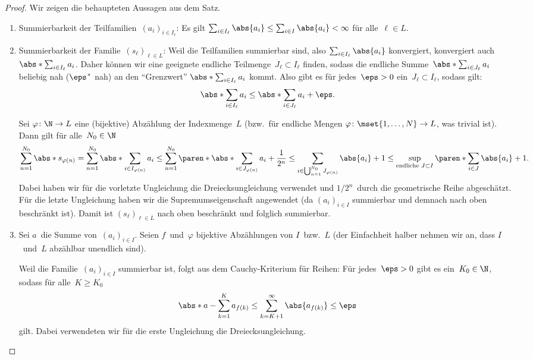 \documentclass[a4paper]{article}
\begin{document}
\begin{proof}
    Wir zeigen die behaupteten Aussagen aus dem Satz.
    \begin{enumerate}
        \item Summierbarkeit der Teilfamilien~$(a_i)_{i\in I_\ell}$: Es gilt $\sum_{i\in I_\ell} \abs{a_i} \leq \sum_{i\in I} \abs{a_i} < \infty$ für alle~$\ell \in L$.
        \item Summierbarkeit der Familie~$(s_\ell)_{\ell\in L}$: Weil die Teilfamilien summierbar sind, also $\sum_{i\in I_\ell} \abs{a_i}$ konvergiert, konvergiert auch $\abs*{\sum_{i\in I_\ell} a_i}$. Daher können wir eine geeignete endliche Teilmenge~$J_\ell \subset I_\ell$ finden, sodass die endliche Summe~$\abs*{\sum_{i\in J_\ell} a_i}$ beliebig nah ($\eps$"~nah) an den "`Grenzwert"' $\abs*{\sum_{i\in I_\ell} a_i}$ kommt. Also gibt es für jedes~$\eps > 0$ ein~$J_\ell \subset I_\ell$, sodass gilt:
              \begin{equation*}
                  \abs*{\sum_{i\in I_\ell} a_i} \leq \abs*{\sum_{i\in J_\ell} a_i}+ \eps.
              \end{equation*}

              Sei $\varphi\colon \N\to L$ eine (bijektive) Abzählung der Indexmenge~$L$ (bzw.\ für endliche Mengen $\varphi\colon \mset{1,\dots,N} \to L$, was trivial ist). Dann gilt für alle~$N_0 \in \N$
              \begin{equation*}
                  \sum_{n=1}^{N_0} \abs*{s_{\varphi(n)}} = \sum_{n=1}^{N_0} \abs*{\sum_{i\in I_{\varphi(n)}} a_i} \leq  \sum_{n=1}^{N_0} \paren*{\abs*{\sum_{i\in J_{\varphi(n)}} a_i} + \frac{1}{2^n}} \leq \sum_{i\in\bigcup_{n=1}^{N_0} J_{\varphi(n)}} \abs{a_i} + 1 \leq \sup_{\text{endliche } J\subset I} \paren*{\sum_{i\in J} \abs{a_i} + 1}.
              \end{equation*}
              Dabei haben wir für die vorletzte Ungleichung die Dreiecksungleichung verwendet und $1/2^n$~durch die geometrische Reihe abgeschätzt. Für die letzte Ungleichung haben wir die Supremumseigenschaft angewendet (da $(a_i)_{i\in I}$ summierbar und demnach nach oben beschränkt ist). Damit ist $(s_\ell)_{\ell\in L}$ nach oben beschränkt und folglich summierbar.

        \item Sei $a$~die Summe von~$(a_i)_{i\in I}$. Seien $f$~und~$\varphi$ bijektive Abzählungen von $I$~bzw.~$L$ (der Einfachheit halber nehmen wir an, dass $I$~und~$L$ abzählbar unendlich sind).

              Weil die Familie~$(a_i)_{i\in I}$ summierbar ist, folgt aus dem Cauchy-Kriterium für Reihen: Für jedes~$\eps > 0$ gibt es ein~$K_0 \in \N$, sodass für alle~$K \geq K_0$
              \begin{equation*}
                  \abs*{a - \sum_{k=1}^K a_{f(k)}} \leq \sum_{k=K+1}^\infty \abs{a_{f(k)}} \leq \eps
              \end{equation*}
              gilt. Dabei verwendeten wir für die erste Ungleichung die Dreiecksungleichung.


\end{enumerate}
\end{proof}
\end{document}

